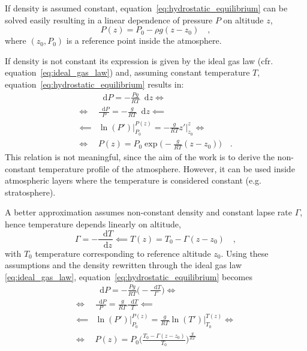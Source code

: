 \documentclass[a4paper,10pt,final,twocolumn]{article}
\newcommand{\dd}{\mathop{}\!\mathrm{d}}
\begin{document}
If density is assumed constant, equation~\eqref{eq:hydrostatic_equilibrium} can be solved easily resulting in a linear dependence of pressure $P$ on altitude $z$, %
\begin{equation}
  \label{eq:pressure_constant_density}
  P(z) = P_0 - \rho g (z - z_0)
  \quad ,
\end{equation}
where $(z_0, P_0)$ is a reference point inside the atmosphere.

If density is not constant its expression is given by the ideal gas law (cfr. equation~\eqref{eq:ideal_gas_law}) and, assuming constant temperature $T$, equation~\eqref{eq:hydrostatic_equilibrium} results in:
\begin{equation}
  \label{eq:pressure_constant_temperature}
  \begin{split}
    & \dd P = - \frac{P g}{R T} \dd z \iff \\
    \iff & \frac{\dd P}{P} = - \frac{g}{R T} \dd z \impliedby \\
    \impliedby & \ln(P') \bigg|_{P_0}^{P(z)} = - \frac{g}{R T} z' \bigg|_{z_0}^{z} \iff \\
    \iff & P(z) = P_0 \exp{\bigg( - \frac{g}{R T} (z - z_0) \bigg)}
    \quad .
  \end{split}
\end{equation}
This relation is not meaningful, since the aim of the work is to derive the non-constant temperature profile of the atmosphere. However, it can be used inside atmospheric layers where the temperature is considered constant (e.g. stratosphere).

A better approximation assumes non-constant density and constant lapse rate $\Gamma$, hence temperature depends linearly on altitude,
\begin{equation}
  \label{eq:constant_lapse_rate}
  \Gamma = - \frac{\dd T}{\dd z} \impliedby T(z) = T_0 - \Gamma (z - z_0)
  \quad ,
\end{equation}
with $T_0$ temperature corresponding to reference altitude $z_0$. Using these assumptions and the density rewritten through the ideal gas law \eqref{eq:ideal_gas_law}, equation~\eqref{eq:hydrostatic_equilibrium} becomes
\begin{equation}
  \label{eq:pressure_constant_lapse_rate}
  \begin{split}
    & \dd P = - \frac{P g}{R T} \bigg( - \frac{\dd T}{\Gamma} \bigg) \iff \\
    \iff & \frac{\dd P}{P} = \frac{g}{R \Gamma} \frac{\dd T}{T} \impliedby \\
    \impliedby & \ln(P') \bigg|_{P_0}^{P(z)} = \frac{g}{R \Gamma} \ln(T') \bigg|_{T_0}^{T(z)} \iff \\
    \iff & P(z) = P_0 \bigg( \frac{T_0 - \Gamma (z - z_0)}{T_0} \bigg)^\frac{g}{R \Gamma}
  \end{split}
\end{equation}
\end{document}
